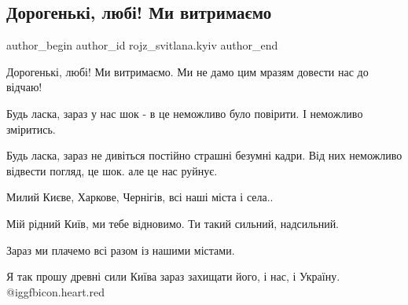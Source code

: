  
 
 
 
 
 
\subsection{Дорогенькі, любі! Ми витримаємо}
\label{sec:28_02_2022.fb.rojz_svitlana.kyiv.1.my_vytrymajemo}
 
\ifcmt
 author_begin
   author_id rojz_svitlana.kyiv
 author_end
\fi

Дорогенькі, любі! Ми витримаємо. Ми не дамо цим мразям довести нас до відчаю!

Будь ласка, зараз у нас шок - в це неможливо було повірити. І неможливо
зміритись.

Будь ласка, зараз не дивіться постійно страшні безумні кадри. Від них неможливо
відвести погляд, це шок. але це нас руйнує.

Милий Києве, Харкове, Чернігів, всі наші міста і села..

Мій рідний Київ, ми тебе відновимо. Ти такий сильний, надсильний.

Зараз ми плачемо всі разом із нашими містами.

Я так прошу древні сили Київа зараз захищати його, і нас, і Україну.
@igg{fbicon.heart.red}

